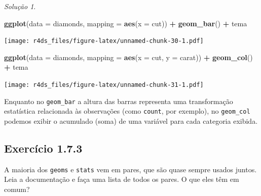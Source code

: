 \documentclass[
]{latex/krantz}
\newenvironment{Shaded}{\begin{snugshade}}{\end{snugshade}}
\newcommand{\AttributeTok}[1]{\textcolor[rgb]{0.13,0.29,0.53}{#1}}
\newcommand{\FunctionTok}[1]{\textcolor[rgb]{0.13,0.29,0.53}{\textbf{#1}}}
\newcommand{\NormalTok}[1]{#1}
\newcommand{\SpecialCharTok}[1]{\textcolor[rgb]{0.81,0.36,0.00}{\textbf{#1}}}
\theoremstyle{definition}
\theoremstyle{definition}
\theoremstyle{definition}
\theoremstyle{definition}
\theoremstyle{remark}
\newtheorem*{solution}{Solução}
\begin{document}
\begin{solution}
\leavevmode

\begin{Shaded}
\begin{Highlighting}[]
\FunctionTok{ggplot}\NormalTok{(}\AttributeTok{data =}\NormalTok{ diamonds, }\AttributeTok{mapping =} \FunctionTok{aes}\NormalTok{(}\AttributeTok{x =}\NormalTok{ cut)) }\SpecialCharTok{+}
    \FunctionTok{geom\_bar}\NormalTok{() }\SpecialCharTok{+}
\NormalTok{    tema}
\end{Highlighting}
\end{Shaded}

\texttt{[image: r4ds\_files/figure-latex/unnamed-chunk-30-1.pdf]}

\begin{Shaded}
\begin{Highlighting}[]
\FunctionTok{ggplot}\NormalTok{(}\AttributeTok{data =}\NormalTok{ diamonds, }\AttributeTok{mapping =} \FunctionTok{aes}\NormalTok{(}\AttributeTok{x =}\NormalTok{ cut, }\AttributeTok{y =}\NormalTok{ carat)) }\SpecialCharTok{+}
    \FunctionTok{geom\_col}\NormalTok{() }\SpecialCharTok{+}
\NormalTok{    tema}
\end{Highlighting}
\end{Shaded}

\texttt{[image: r4ds\_files/figure-latex/unnamed-chunk-31-1.pdf]}

Enquanto no \texttt{geom\_bar} a altura das barras representa uma transformação estatística relacionada às observações (como \texttt{count}, por exemplo), no \texttt{geom\_col} podemos exibir o acumulado (soma) de uma variável para cada categoria exibida.

\end{solution}

\hypertarget{exr1-7-3}{%
\subsection*{Exercício 1.7.3}\label{exr1-7-3}}

A maioria dos \texttt{geoms} e \texttt{stats} vem em pares, que são quase sempre usados juntos. Leia a documentação e faça uma lista de todos os pares. O que eles têm em comum?
\end{document}
